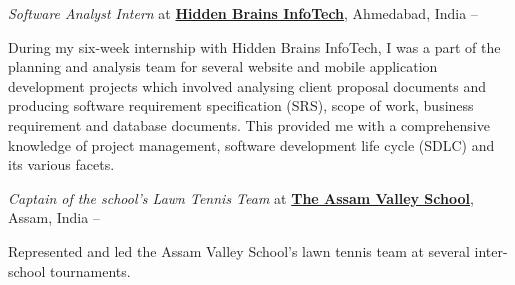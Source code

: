 \documentclass[a4paper,10pt,oneside]{article}
\begin{document}
\begin{body}
\BigEntryGapNoBreak
\textit{Software Analyst Intern} at
\href{http://www.hiddenbrains.com/}
{\textbf{Hidden Brains InfoTech}},
Ahmedabad, India
\hfill
{} --
\EntryGapNoBreak
\begin{detailwithoutsubheading}
\BulletItem
During my six-week internship with Hidden Brains InfoTech, I was a part of the planning and analysis team for several website and mobile application development projects which involved analysing client proposal documents and producing software requirement specification (SRS), scope of work, business requirement and database documents. This provided me with a comprehensive knowledge of project management, software development life cycle (SDLC) and its various facets.
\end{detailwithoutsubheading}

\BigEntryGapNoBreak
\textit{Captain of the school's Lawn Tennis Team} at \href{http://www.assamvalleyschool.com}{\textbf{The Assam Valley School}},
Assam, India
\hfill
{} --
\begin{detailwithoutsubheading}
\BulletItem
Represented and led the Assam Valley School's lawn tennis team at several inter-school tournaments.
\end{detailwithoutsubheading}
\vspace{-5pt}
\hline


\end{body}
\end{document}
